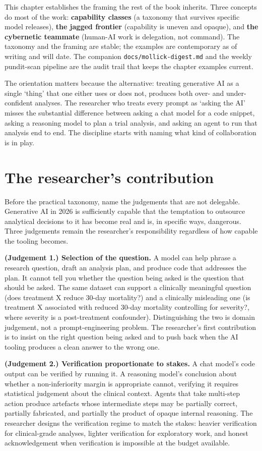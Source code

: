 \documentclass[
  letterpaper,
  11pt]{scrbook}
\begin{document}
This chapter establishes the framing the rest of the book inherits.
Three concepts do most of the work: \textbf{capability classes} (a
taxonomy that survives specific model releases), \textbf{the jagged
frontier} (capability is uneven and opaque), and \textbf{the cybernetic
teammate} (human-AI work is delegation, not command). The taxonomy and
the framing are stable; the examples are contemporary as of writing and
will date. The companion \texttt{docs/mollick-digest.md} and the weekly
pundit-scan pipeline are the audit trail that keeps the chapter examples
current.

The orientation matters because the alternative: treating generative AI
as a single `thing' that one either uses or does not, produces both
over- and under-confident analyses. The researcher who treats every
prompt as `asking the AI' misses the substantial difference between
asking a chat model for a code snippet, asking a reasoning model to plan
a trial analysis, and asking an agent to run that analysis end to end.
The discipline starts with naming what kind of collaboration is in play.

\section{The researcher's contribution}\label{sec-landscape-human}

Before the practical taxonomy, name the judgements that are not
delegable. Generative AI in 2026 is sufficiently capable that the
temptation to outsource analytical decisions to it has become real and
is, in specific ways, dangerous. Three judgements remain the
researcher's responsibility regardless of how capable the tooling
becomes.

\textbf{(Judgement 1.) Selection of the question.} A model can help
phrase a research question, draft an analysis plan, and produce code
that addresses the plan. It cannot tell you whether the question being
asked is the question that should be asked. The same dataset can support
a clinically meaningful question (does treatment X reduce 30-day
mortality?) and a clinically misleading one (is treatment X associated
with reduced 30-day mortality controlling for severity?, where severity
is a post-treatment confounder). Distinguishing the two is domain
judgement, not a prompt-engineering problem. The researcher's first
contribution is to insist on the right question being asked and to push
back when the AI tooling produces a clean answer to the wrong one.

\textbf{(Judgement 2.) Verification proportionate to stakes.} A chat
model's code output can be verified by running it. A reasoning model's
conclusion about whether a non-inferiority margin is appropriate cannot,
verifying it requires statistical judgement about the clinical context.
Agents that take multi-step action produce artefacts whose intermediate
steps may be partially correct, partially fabricated, and partially the
product of opaque internal reasoning. The researcher designs the
verification regime to match the stakes: heavier verification for
clinical-grade analyses, lighter verification for exploratory work, and
honest acknowledgement when verification is impossible at the budget
available.
\end{document}
